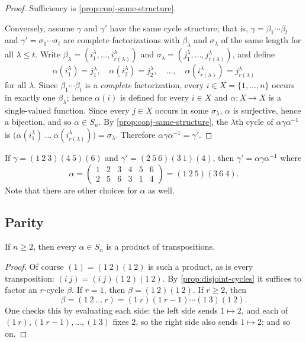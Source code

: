 \begin{proof}
	Sufficiency is \autoref{prop:conj-same-structure}.

	Conversely, assume \(\gamma\) and \(\gamma'\) have the same cycle structure; that is,
	\(\gamma = \beta_1\cdots\beta_t\) and \(\gamma' = \sigma_1\cdots\sigma_t\) are complete
	factorizations with \(\beta_\lambda\) and \(\sigma_\lambda\) of the same length for all
	\(\lambda \leq t\). Write
	\(\beta_\lambda = (i_1^\lambda, \dots, i_{r(\lambda)}^\lambda)\) and
	\(\sigma_\lambda = (j_1^\lambda, \dots, j_{r(\lambda)}^\lambda)\), and define
	\[
		\alpha(i_1^\lambda) = j_1^\lambda, \quad
		\alpha(i_2^\lambda) = j_2^\lambda, \quad \dots, \quad
		\alpha(i_{r(\lambda)}^\lambda) = j_{r(\lambda)}^\lambda
	\]
	for all \(\lambda\). Since \(\beta_1\cdots\beta_t\) is a \emph{complete} factorization,
	every \(i \in X = \{1, \dots, n\}\) occurs in exactly one \(\beta_\lambda\); hence
	\(\alpha(i)\) is defined for every \(i \in X\) and \(\alpha\colon X \to X\) is a
	single-valued function. Since every \(j \in X\) occurs in some \(\sigma_\lambda\),
	\(\alpha\) is surjective, hence a bijection, and so \(\alpha \in S_n\). By
	\autoref{prop:conj-same-structure}, the \(\lambda\)th cycle of
	\(\alpha\gamma\alpha^{-1}\) is
	\(\bigl(\alpha(i_1^\lambda)\ \dots\ \alpha(i_{r(\lambda)}^\lambda)\bigr) = \sigma_\lambda\).
	Therefore \(\alpha\gamma\alpha^{-1} = \gamma'\).
\end{proof}

\begin{eg}
	If \(\gamma = (1\ 2\ 3)(4\ 5)(6)\) and \(\gamma' = (2\ 5\ 6)(3\ 1)(4)\), then
	\(\gamma' = \alpha\gamma\alpha^{-1}\) where
	\[
		\alpha = \begin{pmatrix} 1&2&3&4&5&6 \\ 2&5&6&3&1&4 \end{pmatrix}
		= (1\ 2\ 5)(3\ 6\ 4).
	\]
	Note that there are other choices for \(\alpha\) as well.
\end{eg}

\subsection{Parity}

\begin{proposition}\label{prop:product-of-transpositions}
	If \(n \geq 2\), then every \(\alpha \in S_n\) is a product of transpositions.
\end{proposition}

\begin{proof}
	Of course \((1) = (1\ 2)(1\ 2)\) is such a product, as is every transposition:
	\((i\ j) = (i\ j)(1\ 2)(1\ 2)\). By \autoref{prop:disjoint-cycles} it suffices to
	factor an \(r\)-cycle \(\beta\). If \(r = 1\), then \(\beta = (1\ 2)(1\ 2)\). If
	\(r \geq 2\), then
	\[
		\beta = (1\ 2\ \dots\ r) = (1\ r)(1\ r-1)\cdots(1\ 3)(1\ 2).
	\]
	One checks this by evaluating each side: the left side sends \(1 \mapsto 2\), and each of
	\((1\ r), (1\ r-1), \dots, (1\ 3)\) fixes \(2\), so the right side also sends
	\(1 \mapsto 2\); and so on.
\end{proof}

